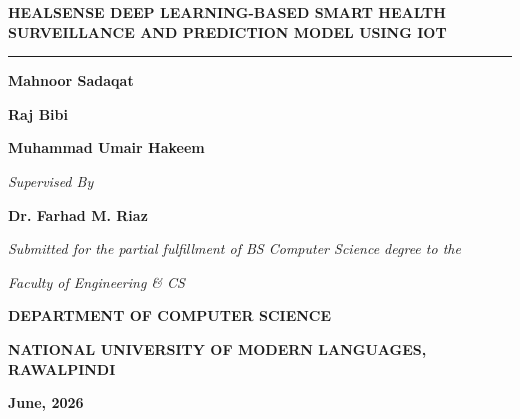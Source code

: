 \documentclass[12pt,a4paper]{report}
\begin{document}
\begin{titlepage}
    \centering
    \vspace*{1cm}
    
    {\fontsize{18pt}{22pt}\selectfont\textbf{HEALSENSE DEEP LEARNING-BASED SMART HEALTH SURVEILLANCE AND PREDICTION MODEL USING IOT}\par}
    
    \vspace{1.5cm}
    \rule{4cm}{4cm} %
    
    \vspace{1.5cm}
    {\fontsize{16pt}{20pt}\selectfont\textbf{Mahnoor Sadaqat}\par}
    \vspace{0.3cm}
    {\fontsize{16pt}{20pt}\selectfont\textbf{Raj Bibi}\par}
    \vspace{0.3cm}
    {\fontsize{16pt}{20pt}\selectfont\textbf{Muhammad Umair Hakeem}\par}
    
    \vspace{1.5cm}
    {\fontsize{14pt}{18pt}\selectfont\textit{Supervised By}\par}
    \vspace{0.3cm}
    {\fontsize{16pt}{20pt}\selectfont\textbf{Dr. Farhad M. Riaz}\par}
    
    \vspace{2cm}
    {\fontsize{14pt}{18pt}\selectfont\textit{Submitted for the partial fulfillment of BS Computer Science degree to the}\par}
    \vspace{0.3cm}
    {\fontsize{14pt}{18pt}\selectfont\textit{Faculty of Engineering \& CS}\par}
    
    \vfill
    {\fontsize{14pt}{18pt}\selectfont\textbf{DEPARTMENT OF COMPUTER SCIENCE}\par}
    \vspace{0.3cm}
    {\fontsize{14pt}{18pt}\selectfont\textbf{NATIONAL UNIVERSITY OF MODERN LANGUAGES, RAWALPINDI}\par}
    \vspace{0.3cm}
    {\fontsize{14pt}{18pt}\selectfont\textbf{June, 2026}\par}
\end{titlepage}

\setcounter{page}{2}
\end{document}
